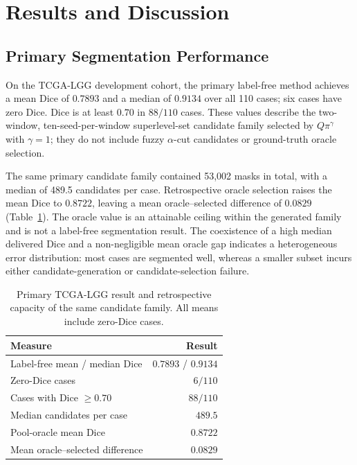 \documentclass[11pt,a4paper]{article}
\begin{document}
\fi

\section{Results and Discussion}\label{sec:results}

\subsection{Primary Segmentation Performance}\label{sec:primary-results}

On the TCGA-LGG development cohort, the primary label-free method achieves a
mean Dice of $0.7893$ and a median of $0.9134$ over all 110 cases; six cases have
zero Dice. Dice is at least $0.70$ in $88/110$ cases. These values describe the
two-window, ten-seed-per-window superlevel-set candidate family selected by
$Q\pi^\gamma$ with $\gamma=1$; they do not include fuzzy $\alpha$-cut candidates
or ground-truth oracle selection.

The same primary candidate family contained 53,002 masks in total, with a median
of 489.5 candidates per case. Retrospective oracle selection raises the mean Dice
to $0.8722$, leaving a mean oracle--selected difference of $0.0829$
(Table~\ref{tab:selection}). The oracle value is an attainable ceiling within the
generated family and is not a label-free segmentation result. The coexistence of
a high median delivered Dice and a non-negligible mean oracle gap indicates a
heterogeneous error distribution: most cases are segmented well, whereas a
smaller subset incurs either candidate-generation or candidate-selection
failure.

\begin{table}[htbp]\centering
\caption{Primary TCGA-LGG result and retrospective capacity of the same
candidate family. All means include zero-Dice cases.}\label{tab:selection}
\begin{tabular}{lr}
\toprule
Measure & Result \\
\midrule
Label-free mean / median Dice & $0.7893$ / $0.9134$ \\
Zero-Dice cases & $6/110$ \\
Cases with Dice $\ge0.70$ & $88/110$ \\
Median candidates per case & $489.5$ \\
Pool-oracle mean Dice & $0.8722$ \\
Mean oracle--selected difference & $0.0829$ \\
\bottomrule
\end{tabular}
\end{table}
\end{document}

